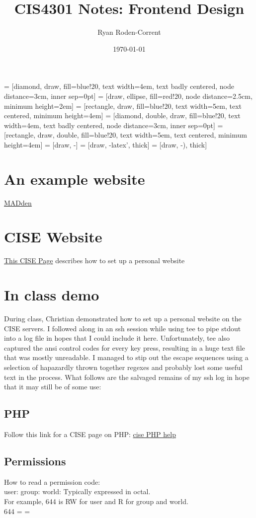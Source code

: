 \documentclass[12pt]{article}
\title{CIS4301 Notes: Frontend Design}
\author{Ryan Roden-Corrent}
\date{\today}
\begin{document}
\setlength\parindent{0pt}
 = [diamond, draw, fill=blue!20, text width=4em,
  text badly centered, node distance=3cm, inner sep=0pt]
 = [draw, ellipse, fill=red!20, node distance=2.5cm,
  minimum height=2em]
 = [rectangle, draw, fill=blue!20, text width=5em,
  text centered, minimum height=4em]
 = [diamond, double, draw, fill=blue!20, text width=4em,
  text badly centered, node distance=3cm, inner sep=0pt]
 = [rectangle, draw, double, fill=blue!20, text width=5em,
  text centered, minimum height=4em]
 = [draw, -]
 = [draw, -latex', thick]
 = [draw, -), thick]
\maketitle
\section{An example website}
\href{http://www.github.com/cegme/MADden}{MADden}
\section{CISE Website}
\href{http://www.cise.ufl.edu/help/web/creating}{This CISE Page} describes how
to set up a personal website
\section{In class demo}
During class, Christian demonstrated how to set up a personal website on the
CISE servers. I followed along in an ssh session while using tee to pipe stdout
into a log file in hopes that I could include it here. Unfortunately, tee also
captured the ansi control codes for every key press, resulting in a huge text
file that was mostly unreadable. I managed to stip out the escape sequences
using a selection of hapazardly thrown together regexes and probably lost some
useful text in the process. What follows are the salvaged remains of my ssh log
in hope that it may still be of some use:
\subsection{PHP}
Follow this link for a CISE page on PHP:
\href{https://www.cise.ufl.edu/help/web/php}{cise PHP help}
\subsection{Permissions}
How to read a permission code:\\
user:  group:  world: 
Typically expressed in octal.\\
For example, 644 is RW for user and R for group
and world.\\
644 =    =
  
\end{document}
